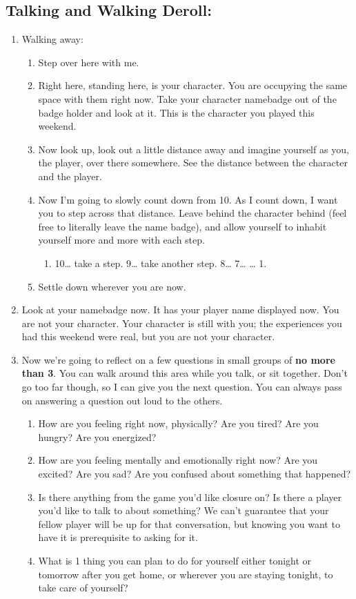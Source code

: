 \documentclass[green]{GL2020}
\begin{document}
\subsection*{Talking and Walking Deroll:}
\begin{enumerate}
	\item Walking away:
	\begin{enumerate}
		\item Step over here with me. 
		\item Right here, standing here, is your character. You are occupying the same space with them right now. Take your character namebadge out of the badge holder and look at it. This is the character you played this weekend.
		\item Now look up, look out a little distance away and imagine yourself as you, the player, over there somewhere. See the distance between the character and the player.
		\item Now I’m going to slowly count down from 10. As I count down, I want you to step across that distance. Leave behind the character behind (feel free to literally leave the name badge), and allow yourself to inhabit yourself more and more with each step.
		\begin{enumerate}
			\item 10… take a step. 9… take another step. 8… 7… … 1.
		\end{enumerate}
		\item Settle down wherever you are now.
	\end{enumerate}
	\item Look at your namebadge now. It has your player name displayed now. You are not your character. Your character is still with you; the experiences you had this weekend were real, but you are not your character.
	\item Now we’re going to reflect on a few questions in small groups of \textbf{no more than 3}. You can walk around this area while you talk, or sit together. Don’t go too far though, so I can give you the next question. You can always pass on answering a question out loud to the others.
	\begin{enumerate}
		\item How are you feeling right now, physically? Are you tired? Are you hungry? Are you energized?
		\item How are you feeling mentally and emotionally right now? Are you excited? Are you sad? Are you confused about something that happened?
		\item Is there anything from the game you’d like closure on? Is there a player you’d like to talk to about something? We can’t guarantee that your fellow player will be up for that conversation, but knowing you want to have it is prerequisite to asking for it.
		\item What is 1 thing you can plan to do for yourself either tonight or tomorrow after you get home, or wherever you are staying tonight, to take care of yourself?
	\end{enumerate}
\end{enumerate}
\end{document}
